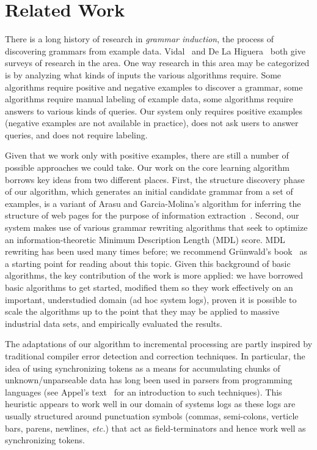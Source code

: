 \section{Related Work}
\label{sec:related}

There is a long history of research in {\em grammar induction},
the process of discovering grammars from example data.  
Vidal~\cite{vidal:gisurvey} and
De La Higuera~\cite{higuera01current} both give surveys
of research in the area.  One way  research in this area
may be categorized is by analyzing what kinds of inputs
the various algorithms require.  Some algorithms
require positive and negative examples to discover a grammar, some
algorithms require manual labeling of example data, some algorithms
require answers to various kinds of queries.  Our system only
requires positive examples (negative examples 
are not available in practice), does not ask users to answer queries,
and does not require labeling.  

Given that we work only with positive examples, there
are still a number of possible approaches we could take.
Our work on the core learning algorithm
borrows key ideas from two different places.
First, the structure discovery phase of our algorithm, which
generates an initial candidate grammar from a set of examples,
is a variant of Arasu and Garcia-Molina's algorithm 
for inferring the structure of web pages for the purpose
of information extraction~\cite{arasu+:sigmod03}.
Second, our system makes use of various grammar
rewriting algorithms that seek to optimize an information-theoretic
Minimum Description Length (MDL) score.  MDL rewriting has been
used many times before; we recommend Gr\"{u}nwald's book~\cite{mdlbook}
as a starting point for reading about this topic.
Given this background of basic algorithms, the key contribution
of the work is more applied:  we have borrowed basic algorithms to get
started, modified them so they work effectively on an important,
understudied domain (ad hoc system logs),
proven it is possible to scale the algorithms up
to the point that they may be applied to massive industrial data
sets, and empirically evaluated the results.

The adaptations of our algorithm to incremental processing 
are partly
inspired by traditional compiler error detection and correction
techniques.  In particular, the idea of using synchronizing tokens
as a means for accumulating chunks of unknown/unparseable data
has long been used in parsers from programming languages
(see Appel's text~\cite{appel:modern-compiler} for an
introduction to such techniques).  This heuristic appears to
work well in our domain of systems logs as these logs are
usually structured around punctuation symbols (commas, semi-colons,
verticle bars, parens, newlines, {\em etc.}) that act as
field-terminators and hence work well as synchronizing tokens.

